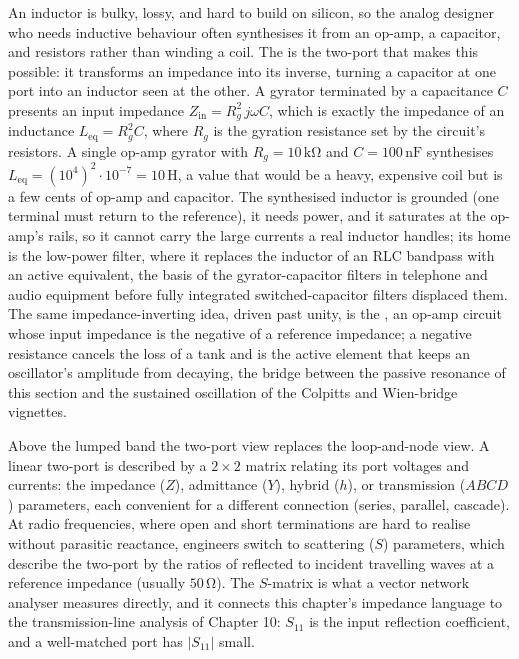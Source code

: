 

\begin{mastery}
An inductor is bulky, lossy, and hard to build on silicon, so the analog
designer who needs inductive behaviour often synthesises it from an op-amp, a
capacitor, and resistors rather than winding a coil. The  is
the two-port that makes this possible: it transforms an impedance into its
inverse, turning a capacitor at one port into an inductor seen at the other. A
gyrator terminated by a capacitance $C$ presents an input impedance
$Z_{\text{in}} = R_g^{2}\,j\omega C$, which is exactly the impedance of an
inductance $L_{\text{eq}} = R_g^{2}C$, where $R_g$ is the gyration resistance
set by the circuit's resistors. A single op-amp gyrator with $R_g =
10\,\si{\kilo\ohm}$ and $C = 100\,\si{\nano\farad}$ synthesises $L_{\text{eq}} =
(10^{4})^{2}\cdot 10^{-7} = 10\,\si{\henry}$, a value that would be a heavy,
expensive coil but is a few cents of op-amp and capacitor. The synthesised
inductor is grounded (one terminal must return to the reference), it needs power,
and it saturates at the op-amp's rails, so it cannot carry the large currents a
real inductor handles; its home is the low-power filter, where it replaces the
inductor of an RLC bandpass with an active equivalent, the basis of the
gyrator-capacitor filters in telephone and audio equipment before fully
integrated switched-capacitor filters displaced them. The same impedance-inverting
idea, driven past unity, is the , an op-amp
circuit whose input impedance is the negative of a reference impedance; a negative
resistance cancels the loss of a tank and is the active element that keeps an
oscillator's amplitude from decaying, the bridge between the passive resonance of
this section and the sustained oscillation of the Colpitts and Wien-bridge
vignettes.
\end{mastery}

\begin{mastery}
Above the lumped band the two-port view replaces the loop-and-node view.
A linear two-port is described by a $2\times 2$ matrix relating its port
voltages and currents: the impedance ($Z$), admittance ($Y$), hybrid
($h$), or transmission ($ABCD$) parameters, each convenient for a
different connection (series, parallel, cascade). At radio frequencies,
where open and short terminations are hard to realise without parasitic
reactance, engineers switch to scattering ($S$) parameters, which
describe the two-port by the ratios of reflected to incident travelling
waves at a reference impedance (usually $50\,\si{\ohm}$). The $S$-matrix
is what a vector network analyser measures directly, and it connects
this chapter's impedance language to the transmission-line analysis of
Chapter 10: $S_{11}$ is the input reflection coefficient, and a
well-matched port has $|S_{11}|$ small.
\end{mastery}

